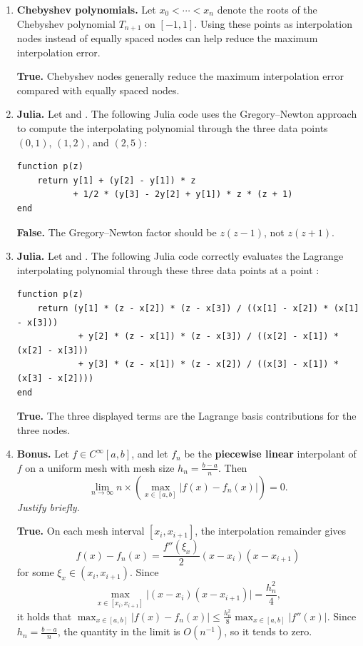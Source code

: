 \documentclass[a4paper]{article}
\newcommand{\answer}[1]{%
    \ifdefined\showsolutions
        \par\smallskip
        {\small\color{blue!60!black}#1\par}
    \fi
}
\begin{document}
\begin{enumerate}
    \item
        \textbf{Chebyshev polynomials.}
        Let $x_0 < \dotsb < x_n$ denote the roots of the Chebyshev polynomial $T_{n+1}$ on $[-1,1]$.
        Using these points as interpolation nodes instead of equally spaced nodes can help reduce the maximum interpolation error.
        \answer{\textbf{True.}
        Chebyshev nodes generally reduce the maximum interpolation error compared with equally spaced nodes.}

    \item
        \textbf{Julia.}
        Let  and . The following Julia code uses
        the Gregory--Newton approach to compute the interpolating polynomial through the three data
        points $(0,1)$, $(1,2)$, and $(2,5)$:
        \begin{verbatim}
function p(z)
    return y[1] + (y[2] - y[1]) * z
           + 1/2 * (y[3] - 2y[2] + y[1]) * z * (z + 1)
end
        \end{verbatim}
        \answer{\textbf{False.}
        The Gregory--Newton factor should be $z(z-1)$, not $z(z+1)$.}

    \item
        \textbf{Julia.}
        Let  and . The following
        Julia code correctly evaluates the Lagrange interpolating polynomial through these three
        data points at a point :
        \begin{verbatim}
function p(z)
    return (y[1] * (z - x[2]) * (z - x[3]) / ((x[1] - x[2]) * (x[1] - x[3]))
            + y[2] * (z - x[1]) * (z - x[3]) / ((x[2] - x[1]) * (x[2] - x[3]))
            + y[3] * (z - x[1]) * (z - x[2]) / ((x[3] - x[1]) * (x[3] - x[2])))
end
        \end{verbatim}
        \answer{\textbf{True.}
        The three displayed terms are the Lagrange basis contributions for the three nodes.}

    \item \textbf{Bonus.}
        Let $f\in C^{\infty}[a,b]$, and let $f_n$ be the \textbf{piecewise linear} interpolant of $f$ on a
        uniform mesh with mesh size $h_n= \frac{b-a}{n}$. 
        Then
        \[
            \lim_{n \to \infty} n \times \left( \max_{x\in[a,b]}\bigl\lvert f(x)-f_n(x)\bigr\rvert \right)=0.
        \]
        \emph{Justify briefly.}
        \answer{\textbf{True.}
        On each mesh interval $[x_i,x_{i+1}]$, the interpolation remainder gives
        \[
            f(x)-f_n(x)=\frac{f''(\xi_x)}{2}(x-x_i)(x-x_{i+1})
        \]
        for some $\xi_x\in(x_i,x_{i+1})$. Since
        \[
            \max_{x\in[x_i,x_{i+1}]}\lvert(x-x_i)(x-x_{i+1})\rvert
            =\frac{h_n^2}{4},
        \]
        it holds that $\max_{x\in[a,b]}\lvert f(x)-f_n(x)\rvert \leq \frac{h_n^2}{8} \max_{x\in[a,b]}\lvert f''(x)\rvert$.
        Since $h_n = \frac{b-a}{n}$, the quantity in the limit is $O(n^{-1})$, so it tends to zero.}
\end{enumerate}
\end{document}

